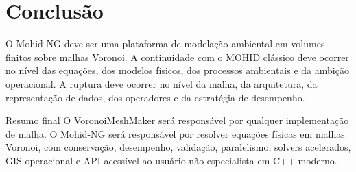 \documentclass[11pt,a4paper]{article}
\begin{document}
\section{Conclus\~ao}

O Mohid-NG deve ser uma plataforma de modela\c{c}\~ao ambiental em volumes finitos sobre malhas Voronoi. A continuidade com o MOHID cl\'assico deve ocorrer no n\'ivel das equa\c{c}\~oes, dos modelos f\'isicos, dos processos ambientais e da ambi\c{c}\~ao operacional. A ruptura deve ocorrer no n\'ivel da malha, da arquitetura, da representa\c{c}\~ao de dados, dos operadores e da estrat\'egia de desempenho.

\begin{principlebox}{Resumo final}
O VoronoiMeshMaker ser\'a respons\'avel por qualquer implementa\c{c}\~ao de malha. O Mohid-NG ser\'a respons\'avel por resolver equa\c{c}\~oes f\'isicas em malhas Voronoi, com conserva\c{c}\~ao, desempenho, valida\c{c}\~ao, paralelismo, solvers acelerados, GIS operacional e API acess\'ivel ao usu\'ario n\~ao especialista em C++ moderno.
\end{principlebox}
\end{document}
